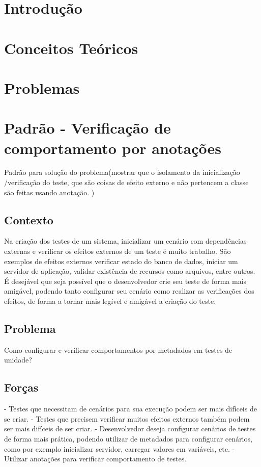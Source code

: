 \documentclass[12pt,a4paper,oneside]{book}
\begin{document}


\chapter{Introdução}

\chapter{Conceitos Teóricos}

\chapter{Problemas}


\chapter{Padrão - Verificação de comportamento por anotações}

Padrão para solução do problema(mostrar que o isolamento da inicialização /verificação do teste, que são coisas de efeito externo e não pertencem a classe são feitas  usando anotação. )


\section{Contexto}
Na criação dos testes de um sistema, inicializar um cenário com dependências externas e verificar os efeitos externos de um teste é muito trabalho. São exemplos de efeitos externos verificar estado do banco de dados, iniciar um servidor de aplicação, validar existência de recursos como arquivos, entre outros. É desejável que seja possível que o desenvolvedor crie seu teste de forma mais amigável, podendo tanto configurar seu cenário como realizar as verificações dos efeitos, de forma a tornar mais legível e amigável a criação do teste.

\section{Problema}
Como configurar e verificar comportamentos por metadados em testes de unidade?

\section{Forças}
- Testes que necessitam de cenários para sua execução podem ser mais difíceis de se criar.
- Testes que precisem verificar muitos efeitos externos também podem ser mais difíceis de ser criar. 
- Desenvolvedor deseja configurar cenários de testes de forma mais prática, podendo utilizar de metadados para configurar cenários, como por exemplo inicializar servidor, carregar valores em variáveis, etc.
- Utilizar anotações para verificar comportamento de testes.
\end{document}
